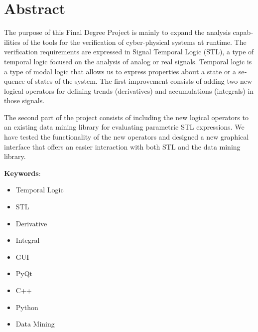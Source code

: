 \section*{Abstract}
\begin{otherlanguage}{british}
The purpose of this Final Degree Project is mainly to expand the analysis capabilities of the tools for the verification of cyber-physical systems at runtime. The verification requirements are expressed in Signal Temporal Logic (STL), a type of temporal logic focused on the analysis of analog or real signals. Temporal logic is a type of modal logic that allows us to express properties about a state or a sequence of states of the system. The first improvement consists of adding two new logical operators for defining trends (derivatives) and accumulations (integrals) in those signals.

The second part of the project consists of including the new logical operators to an existing data mining library for evaluating parametric STL expressions. We have tested the functionality of the new operators and designed a new graphical interface that offers an easier interaction with both STL and the data mining library.
\end{otherlanguage}

\textbf{Keywords}:
\begin{itemize}
\item Temporal Logic
\item STL
\item Derivative
\item Integral
\item GUI
\item PyQt
\item C++
\item Python
\item Data Mining
\end{itemize}